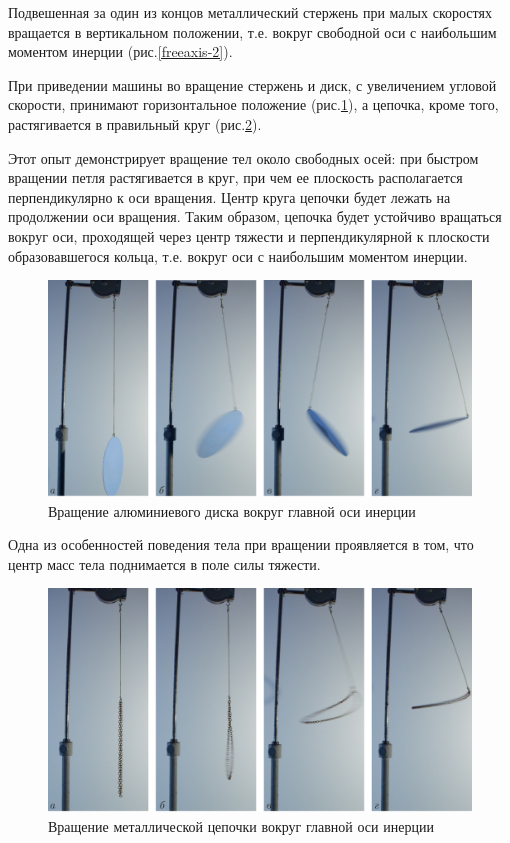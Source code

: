 \documentclass[14pt,a4paper,oneside]{extarticle}	%
\begin{document}
Подвешенная за один из концов металлический стержень при малых скоростях вращается в вертикальном положении, т.е. вокруг свободной оси с наибольшим моментом инерции (рис.\ref{freeaxis-2}).


При приведении машины во вращение стержень и диск, с увеличением угловой скорости, принимают горизонтальное положение (рис.\ref{freeaxis-3}), а цепочка, кроме того, растягивается в правильный круг (рис.\ref{freeaxis-4}).

Этот опыт демонстрирует вращение тел около свободных осей: при быстром вращении петля растягивается в круг, при чем ее плоскость располагается перпендикулярно к оси вращения. Центр круга цепочки будет лежать на продолжении оси вращения. Таким образом, цепочка будет устойчиво вращаться вокруг оси, проходящей через центр тяжести и перпендикулярной к плоскости образовавшегося кольца, т.е. вокруг оси с наибольшим моментом инерции.

\begin{figure}[H] 	
	\centering 		
	\includegraphics[width=0.75\linewidth]{freeaxis-3.png}
	\caption{Вращение алюминиевого диска вокруг главной оси инерции}
	\label{freeaxis-3}
\end{figure}

Одна из особенностей поведения тела при вращении проявляется в том, что центр масс тела поднимается в поле силы тяжести.

\begin{figure}[H]
	\centering 	
	\includegraphics[width=0.75\linewidth]{freeaxis-4.png}
	\caption{Вращение металлической цепочки вокруг главной оси инерции}
	\label{freeaxis-4}
\end{figure}
\end{document}
